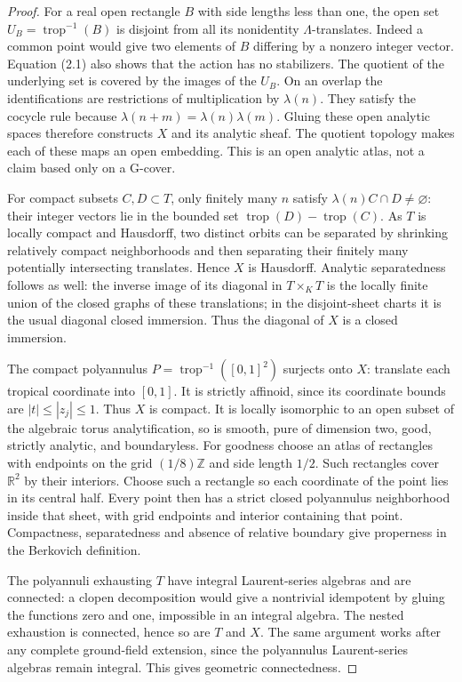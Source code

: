 \documentclass[11pt]{article}
\theoremstyle{definition}\newtheorem{definition}[theorem]{Definition}
\newcommand{\trop}{\operatorname{trop}}
\newcommand{\R}{\mathbb R}
\newcommand{\Z}{\mathbb Z}
\begin{document}
\begin{proof}
For a real open rectangle $B$ with side lengths less than one, the open set
$U_B=\trop^{-1}(B)$ is disjoint from all its nonidentity $\Lambda$-translates.
Indeed a common point would give two elements of $B$ differing by a nonzero
integer vector. Equation (2.1) also shows that the action has no stabilizers.
The quotient of the underlying set is covered by the images of the $U_B$.
On an overlap the identifications are restrictions of multiplication by
$\lambda(n)$. They satisfy the cocycle rule because
$\lambda(n+m)=\lambda(n)\lambda(m)$. Gluing these open analytic spaces
therefore constructs $X$ and its analytic sheaf. The quotient topology makes
each of these maps an open embedding. This is an open analytic atlas, not a
claim based only on a G-cover.

For compact subsets $C,D\subset T$, only finitely many $n$ satisfy
$\lambda(n)C\cap D\ne\varnothing$: their integer vectors lie in the bounded
set $\trop(D)-\trop(C)$. As $T$ is locally compact and Hausdorff, two distinct
orbits can be separated by shrinking relatively compact neighborhoods and
then separating their finitely many potentially intersecting translates.
Hence $X$ is Hausdorff. Analytic separatedness follows as well: the inverse
image of its diagonal in $T\times_KT$ is the locally finite union of the
closed graphs of these translations; in the disjoint-sheet charts it is the
usual diagonal closed immersion. Thus the diagonal of $X$ is a closed
immersion.

The compact polyannulus $P=\trop^{-1}([0,1]^2)$ surjects onto $X$: translate
each tropical coordinate into $[0,1]$. It is strictly affinoid, since its
coordinate bounds are $|t|\le |z_j|\le1$. Thus $X$ is compact. It is locally
isomorphic to an open subset of the algebraic torus analytification, so is
smooth, pure of dimension two, good, strictly analytic, and boundaryless.
For goodness choose an atlas of rectangles with endpoints on the grid
$(1/8)\Z$ and side length $1/2$. Such rectangles cover $\R^2$ by their
interiors. Choose such a rectangle so each coordinate of the point lies
in its central half. Every point then has a strict closed polyannulus
neighborhood inside that sheet, with grid endpoints and interior containing that
point. Compactness, separatedness and absence of relative boundary give
properness in the Berkovich definition.

The polyannuli exhausting $T$ have integral Laurent-series algebras and are
connected: a clopen decomposition would give a nontrivial idempotent by
gluing the functions zero and one, impossible in an integral algebra. The
nested exhaustion is connected, hence so are $T$ and $X$. The same argument
works after any complete ground-field extension, since the polyannulus
Laurent-series algebras remain integral. This gives geometric connectedness.


\end{proof}
\end{document}
